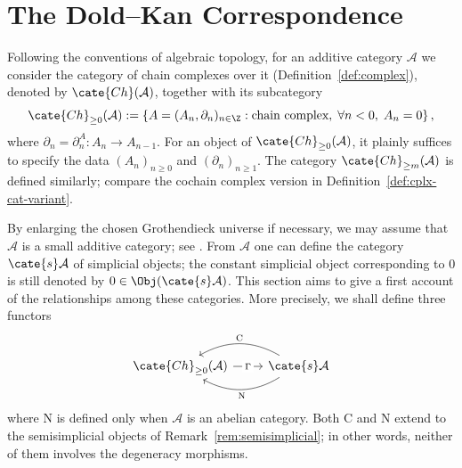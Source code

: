 
\section{The Dold--Kan Correspondence}\label{sec:Dold-Kan}
\hypertarget{o014.aljabr2.chapter8.dold-kan-a}{ }
Following the conventions of algebraic topology, for an additive category
$\mathcal{A}$ we consider the category of chain complexes over it
(Definition~\ref{def:complex}), denoted by $\cate{Ch}(\mathcal{A})$, together
with its subcategory
\[ \cate{Ch}_{\geq 0}(\mathcal{A}) := \left\{ A = (A_n, \partial_n)_{n \in \Z} : \text{chain complex}, \; \forall n < 0, \; A_n = 0 \right\}, \]
where $\partial_n=\partial_n^A:A_n\to A_{n-1}$. For an object of
$\cate{Ch}_{\geq0}(\mathcal{A})$, it plainly suffices to specify the data
$(A_n)_{n\geq0}$ and $(\partial_n)_{n\geq1}$. The category
$\cate{Ch}_{\geq m}(\mathcal{A})$ is defined similarly; compare the cochain
complex version in Definition~\ref{def:cplx-cat-variant}.

By enlarging the chosen Grothendieck universe if necessary, we may assume that
$\mathcal{A}$ is a small additive category; see
\cite[Assumption 1.5.2]{Li1}. From $\mathcal{A}$ one can define the category
$\cate{s}\mathcal{A}$ of simplicial objects; the constant simplicial object
corresponding to $0$ is still denoted by
$0\in\Obj(\cate{s}\mathcal{A})$. This section aims to give a first account of
the relationships among these categories. More precisely, we shall define
three functors
\[\begin{tikzcd}
	\cate{Ch}_{\geq 0}(\mathcal{A}) \arrow[r, "\Gamma" description] & \cate{s}\mathcal{A} \arrow[bend left, l, "{\mathrm{N}}"] \arrow[bend right, l, "{\mathrm{C}}"']
\end{tikzcd}\]
where $\mathrm{N}$ is defined only when $\mathcal{A}$ is an abelian category.
Both $\mathrm{C}$ and $\mathrm{N}$ extend to the semisimplicial objects of
Remark~\ref{rem:semisimplicial}; in other words, neither of them involves the
degeneracy morphisms.

